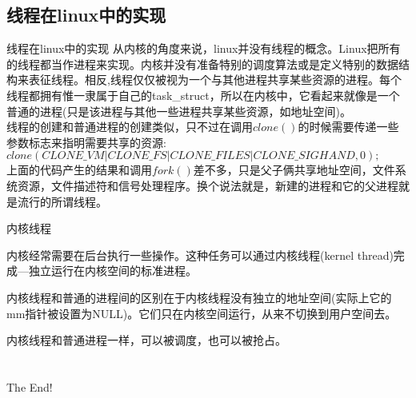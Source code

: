 \documentclass[10pt,compress,mathserif,red]{beamer}
\begin{document}
\begin{CJK*}{UTF8}{gkai}
\subsection{线程在linux中的实现}
\begin{frame}{线程在linux中的实现}
从内核的角度来说，linux并没有线程的概念。Linux把所有的线程都当作进程来实现。内核并没有准备特别的调度算法或是定义特别的数据结构来表征线程。相反,{\color{red}线程仅仅被视为一个与其他进程共享某些资源的进程。}每个线程都拥有惟一隶属于自己的task\_struct，所以在内核中，它看起来就像是一个普通的进程(只是该进程与其他一些进程共享某些资源，如地址空间)。\\
线程的创建和普通进程的创建类似，只不过在调用$clone()$的时候需要传递一些参数标志来指明需要共享的资源:\\
{\small
$clone(CLONE\_VM | CLONE\_FS | CLONE\_FILES | CLONE\_SIGHAND, 0);$
}\\
上面的代码产生的结果和调用$fork()$差不多，只是父子俩共享地址空间，文件系统资源，文件描述符和信号处理程序。换个说法就是，新建的进程和它的父进程就是流行的所谓线程。
\end{frame}
\begin{frame}{内核线程}
\begin{block}{}
内核经常需要在后台执行一些操作。这种任务可以通过内核线程(kernel thread)完成---独立运行在内核空间的标准进程。
\end{block}
\begin{block}{}
内核线程和普通的进程间的区别在于内核线程没有独立的地址空间(实际上它的mm指针被设置为NULL)。它们只在内核空间运行，从来不切换到用户空间去。
\end{block}
内核线程和普通进程一样，可以被调度，也可以被抢占。
\end{frame}
\section{}
\subsection{}
\begin{frame}{}
\begin{block}{}
{\huge
\begin{center}
The End!
\end{center}
}
\end{block}
\end{frame}
\end{CJK*}
\end{document}
